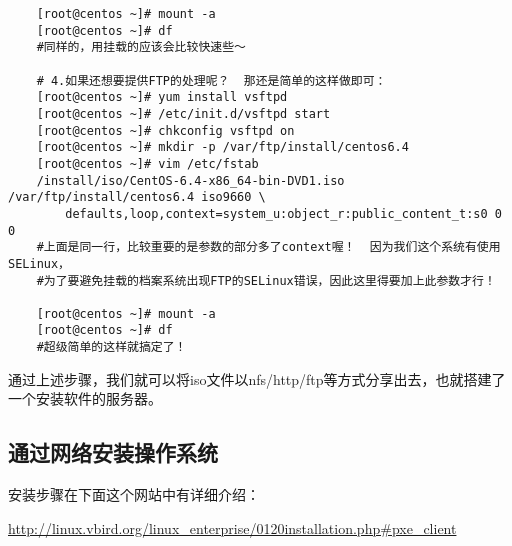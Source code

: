 \documentclass[a4paper,left=1.5cm,right=1.5cm,11pt]{article}
\begin{document}
\begin{lstlisting}
	[root@centos ~]# mount -a
	[root@centos ~]# df
	#同样的，用挂载的应该会比较快速些～

	# 4.如果还想要提供FTP的处理呢？  那还是简单的这样做即可：
	[root@centos ~]# yum install vsftpd
	[root@centos ~]# /etc/init.d/vsftpd start
	[root@centos ~]# chkconfig vsftpd on
	[root@centos ~]# mkdir -p /var/ftp/install/centos6.4
	[root@centos ~]# vim /etc/fstab
	/install/iso/CentOS-6.4-x86_64-bin-DVD1.iso /var/ftp/install/centos6.4 iso9660 \ 
		defaults,loop,context=system_u:object_r:public_content_t:s0 0 0
	#上面是同一行，比较重要的是参数的部分多了context喔！  因为我们这个系统有使用SELinux， 
	#为了要避免挂载的档案系统出现FTP的SELinux错误，因此这里得要加上此参数才行！

	[root@centos ~]# mount -a
	[root@centos ~]# df
	#超级简单的这样就搞定了！
	\end{lstlisting}

	通过上述步骤，我们就可以将iso文件以nfs/http/ftp等方式分享出去，也就搭建了一个安装软件的服务器。

\subsection{通过网络安装操作系统}
	安装步骤在下面这个网站中有详细介绍：\par
	\url{http://linux.vbird.org/linux_enterprise/0120installation.php#pxe_client}
\end{document}
